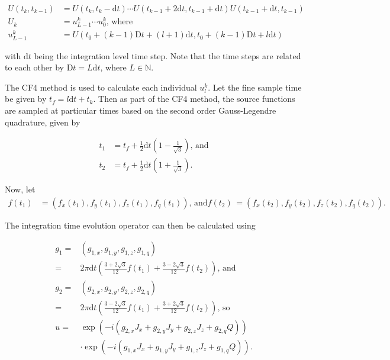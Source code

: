 \documentclass{jors}
\begin{document}
			\begin{align}
				U(t_k, t_{k-1}) &= U(t_k, t_k - \mathrm{d}t) \cdots U(t_{k-1} + 2\mathrm{d}t, t_{k-1} + \mathrm{d}t) U(t_{k-1} + \mathrm{d}t, t_{k-1})\\
				U_k &= u^k_{L-1} \cdots u^k_0\textrm{, where}\\
				u^k_{L-1} &= U(t_0 + (k - 1)\mathrm{D}t + (l + 1)\mathrm{d}t, t_0 + (k - 1)\mathrm{D}t + l\mathrm{d}t)
			\end{align}

			with \(\mathrm{d}t\) being the integration level time step. Note that the time steps are related to each other by \(\mathrm{D}t = L\mathrm{d}t\), where \(L\in\mathbb{N}\).

			The CF4 method is used to calculate each individual \(u^k_l\). Let the fine sample time be given by \(t_f = l\mathrm{d}t + t_k\). Then as part of the CF4 method, the source functions are sampled at particular times based on the second order Gauss-Legendre quadrature, given by
			
			\begin{align}
				t_1 &= t_f + \frac12 \mathrm{d}t\left(1 - \frac{1}{\sqrt{3}}\right)\textrm{, and}\\
				t_2 &= t_f + \frac12 \mathrm{d}t\left(1 + \frac{1}{\sqrt{3}}\right).
			\end{align}

			Now, let
			\begin{align}
				f(t_1) &= (f_x(t_1), f_y(t_1), f_z(t_1), f_q(t_1))\textrm{, and}
				f(t_2) &= (f_x(t_2), f_y(t_2), f_z(t_2), f_q(t_2)).
			\end{align}
			
			The integration time evolution operator can then be calculated using
			
			\begin{align}
				g_1 =& (g_{1,x}, g_{1,y}, g_{1,z}, g_{1,q})\\
				=& 2 \pi \mathrm{d}t \left(\frac{3 + 2 \sqrt{3}}{12} f(t_1) + \frac{3 - 2 \sqrt{3}}{12} f(t_2)\right)\textrm{, and}\\
				g_2 =& (g_{2,x}, g_{2,y}, g_{2,z}, g_{2,q})\\
				=& 2 \pi \mathrm{d}t \left(\frac{3 - 2 \sqrt{3}}{12} f(t_1) + \frac{3 + 2 \sqrt{3}}{12} f(t_2)\right)\textrm{, so}\\
				u =& \exp(-i \left( g_{2,x} J_x + g_{2,y} J_y + g_{2,z} J_z + g_{2,q} Q\right))\\
				&\cdot\exp(-i \left( g_{1,x} J_x + g_{1,y} J_y + g_{1,z} J_z + g_{1,q} Q\right)).
			\end{align}
\end{document}
